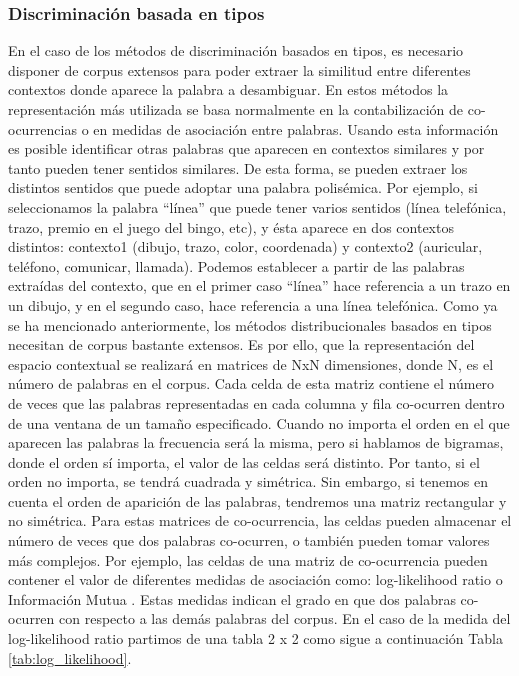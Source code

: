 \subsubsection*{Discriminación basada en tipos}
En el caso de los métodos de discriminación basados en tipos, es necesario disponer de corpus extensos para poder extraer la similitud entre diferentes contextos donde aparece la palabra a desambiguar. En estos métodos la representación más utilizada se basa normalmente en la contabilización de co-ocurrencias o en medidas de asociación entre palabras. Usando esta información es posible identificar otras palabras que aparecen en contextos similares y por tanto pueden tener sentidos similares. De esta forma, se pueden extraer los distintos sentidos que puede adoptar una palabra polisémica. Por ejemplo, si seleccionamos la palabra “línea” que puede tener varios sentidos (línea telefónica, trazo, premio en el juego del bingo, etc), y ésta aparece en dos contextos distintos: contexto1 (dibujo, trazo, color, coordenada) y contexto2 (auricular, teléfono, comunicar, llamada). Podemos establecer a partir de las palabras extraídas del contexto, que en el primer caso “línea” hace referencia a un trazo en un dibujo, y en el segundo caso, hace referencia a una línea telefónica. Como ya se ha mencionado anteriormente, los métodos distribucionales basados en tipos necesitan de corpus bastante extensos. Es por ello, que la representación del espacio contextual se realizará en matrices de NxN dimensiones, donde N, es el número de palabras en el corpus. Cada celda de esta matriz contiene el número de veces que las palabras representadas en cada columna y fila co-ocurren dentro de una ventana de un tamaño especificado. Cuando no importa el orden en el que aparecen las palabras la frecuencia será la misma, pero si hablamos de bigramas, donde el orden sí importa, el valor de las celdas será distinto. Por tanto, si el orden no importa, se tendrá   cuadrada y simétrica. Sin embargo, si tenemos en cuenta el orden de aparición de las palabras, tendremos una matriz rectangular y no simétrica. Para estas matrices de co-ocurrencia, las celdas pueden almacenar el número de veces que dos palabras co-ocurren, o también pueden tomar valores más complejos. Por ejemplo, las celdas de una matriz de co-ocurrencia pueden contener el valor de diferentes medidas de asociación como: log-likelihood ratio \cite{010} o Información Mutua \cite{011}. Estas medidas indican el grado en que dos palabras co-ocurren con respecto a las demás palabras del corpus. En el caso de la medida del log-likelihood ratio partimos de una tabla 2 x 2 como sigue a continuación Tabla \ref{tab:log_likelihood}.

